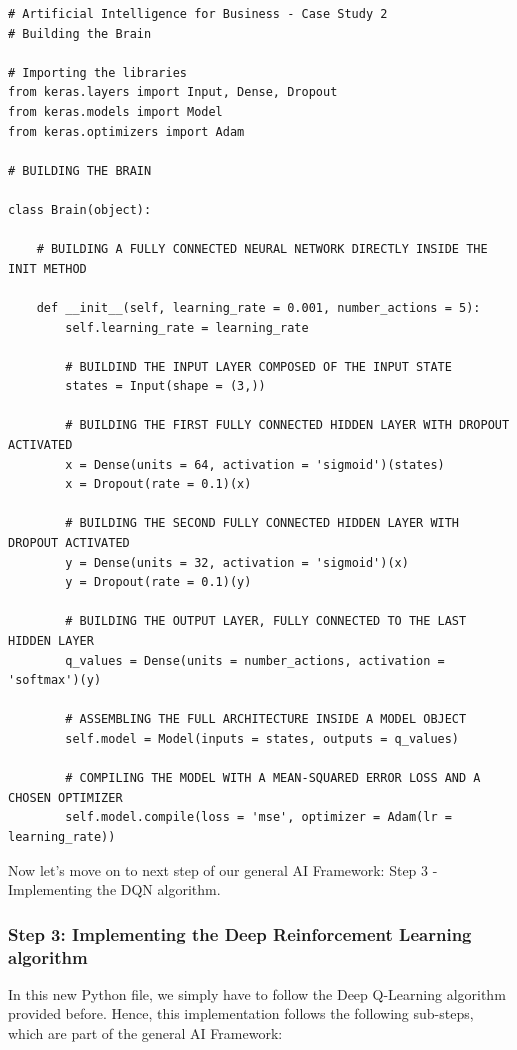 \documentclass[]{book}
\begin{document}
\begin{lstlisting}
# Artificial Intelligence for Business - Case Study 2
# Building the Brain

# Importing the libraries
from keras.layers import Input, Dense, Dropout
from keras.models import Model
from keras.optimizers import Adam

# BUILDING THE BRAIN

class Brain(object):
    
    # BUILDING A FULLY CONNECTED NEURAL NETWORK DIRECTLY INSIDE THE INIT METHOD
    
    def __init__(self, learning_rate = 0.001, number_actions = 5):
        self.learning_rate = learning_rate
        
        # BUILDIND THE INPUT LAYER COMPOSED OF THE INPUT STATE
        states = Input(shape = (3,))
        
        # BUILDING THE FIRST FULLY CONNECTED HIDDEN LAYER WITH DROPOUT ACTIVATED
        x = Dense(units = 64, activation = 'sigmoid')(states)
        x = Dropout(rate = 0.1)(x)
        
        # BUILDING THE SECOND FULLY CONNECTED HIDDEN LAYER WITH DROPOUT ACTIVATED
        y = Dense(units = 32, activation = 'sigmoid')(x)
        y = Dropout(rate = 0.1)(y)
        
        # BUILDING THE OUTPUT LAYER, FULLY CONNECTED TO THE LAST HIDDEN LAYER
        q_values = Dense(units = number_actions, activation = 'softmax')(y)
        
        # ASSEMBLING THE FULL ARCHITECTURE INSIDE A MODEL OBJECT
        self.model = Model(inputs = states, outputs = q_values)
        
        # COMPILING THE MODEL WITH A MEAN-SQUARED ERROR LOSS AND A CHOSEN OPTIMIZER
        self.model.compile(loss = 'mse', optimizer = Adam(lr = learning_rate))
\end{lstlisting}

Now let's move on to next step of our general AI Framework: Step 3 - Implementing the DQN algorithm.

\newpage

\subsubsection{Step 3: Implementing the Deep Reinforcement Learning algorithm}

In this new Python file, we simply have to follow the Deep Q-Learning algorithm provided before. Hence, this implementation follows the following sub-steps, which are part of the general AI Framework:
\end{document}
